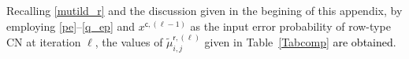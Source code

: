 \documentclass[journal]{IEEEtran}
\newcommand{\mep}{{x}}
\newcommand{\row}{\mathsf{r}}
\newcommand{\col}{\mathsf{c}}
\newcommand{\Puep}{P^{\mathsf{\epsilon}}}
\newcommand{\AG}{\textcolor{black}}
\let\originalleft\left
\let\originalright\right
\renewcommand{\left}{\mathopen{}\mathclose\bgroup\originalleft}
\renewcommand{\right}{\aftergroup\egroup\originalright}
\begin{document}
Recalling \eqref{mutild_r} and the discussion given in the begining of this appendix, by employing \eqref{pe}--\eqref{q_ep} and $\mep^{\col,(\ell-1)}$ as the input error probability of row-type CN at iteration $\ell$, the values of $\tilde \mu _{i,j}^{\row,(\ell )}$ given in Table~\ref{Tabcomp} \AG{are obtained}. 

   
\end{document}
